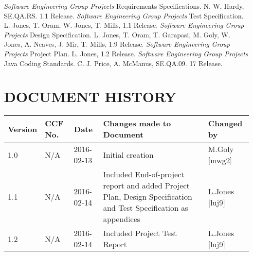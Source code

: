 \documentclass{project}
\begin{document}
\begin{thebibliography}{12}
 \emph{Software Engineering Group Projects}
Requirements Specifications.
N. W. Hardy, SE.QA.RS. 1.1 Release.
 \emph{Software Engineering Group Projects}
Test Specification.
L. Jones, T. Oram, W. Jones, T. Mills, 1.1 Release.
 \emph{Software Engineering Group Projects}
Design Specification.
L. Jones, T. Oram, T. Garapasi, M. Goly, W. Jones, A. Neaves, J. Mir, T. Mills, 1.9 Release.
 \emph{Software Engineering Group Projects}
Project Plan.
L. Jones, 1.2 Release.
 \emph{Software Engineering Group Projects}
Java Coding Standards.
C. J. Price, A. McManus, SE.QA.09. 17 Release.
\end{thebibliography}

\section*{DOCUMENT HISTORY}
\begin{tabular}{|l | l | l | p{8cm} |l | }
\hline
Version & CCF No. & Date & Changes made to Document & Changed by \\
\hline
1.0 & N/A & 2016-02-13 & Initial creation & M.Goly [mwg2] \\
\hline
1.1 & N/A & 2016-02-14 & Included End-of-project report and added Project Plan, Design Specification and Test Specification as appendices & L.Jones [luj9] \\
\hline
1.2 & N/A & 2016-02-14 & Included Project Test Report & L.Jones [luj9] \\
\hline
\end{tabular}
\label{thelastpage}




\end{document}
